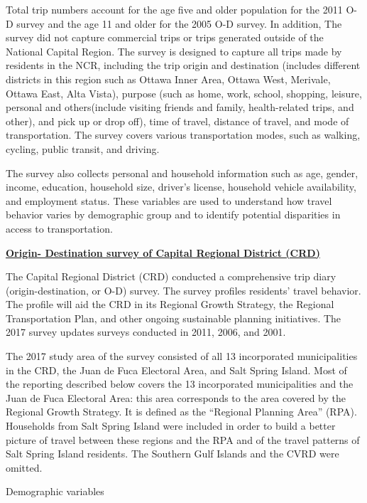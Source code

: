 \documentclass[12pt,twoside]{reedthesis}
\begin{document}
Total trip numbers account for the age five and older population for the 2011 O-D survey and the age 11 and older for the 2005 O-D survey. In addition, The survey did not capture commercial trips or trips generated outside of the National Capital Region. The survey is designed to capture all trips made by residents in the NCR, including the trip origin and destination (includes different districts in this region such as Ottawa Inner Area, Ottawa West, Merivale, Ottawa East, Alta Vista), purpose (such as home, work, school, shopping, leisure, personal and others(include visiting friends and family, health-related trips, and other), and pick up or drop off), time of travel, distance of travel, and mode of transportation. The survey covers various transportation modes, such as walking, cycling, public transit, and driving.

The survey also collects personal and household information such as age, gender, income, education, household size, driver's license, household vehicle availability, and employment status. These variables are used to understand how travel behavior varies by demographic group and to identify potential disparities in access to transportation.

\textbf{\href{https://www.crd.bc.ca/project/regional-transportation/origin-destination-household-travel}{Origin- Destination survey of Capital Regional District (CRD)}}

The Capital Regional District (CRD) conducted a comprehensive trip diary (origin-destination, or O-D) survey. The survey profiles residents' travel behavior. The profile will aid the CRD in its Regional Growth Strategy, the Regional Transportation Plan, and other ongoing sustainable planning initiatives. The 2017 survey updates surveys conducted in 2011, 2006, and 2001.

The 2017 study area of the survey consisted of all 13 incorporated municipalities in the CRD, the Juan de Fuca Electoral Area, and Salt Spring Island. Most of the reporting described below covers the 13 incorporated municipalities and the Juan de Fuca Electoral Area: this area corresponds to the area covered by the Regional Growth Strategy. It is defined as the ``Regional Planning Area'' (RPA). Households from Salt Spring Island were included in order to build a better picture of travel between these regions and the RPA and of the travel patterns of Salt Spring Island residents. The Southern Gulf Islands and the CVRD were omitted.

Demographic variables
\end{document}
